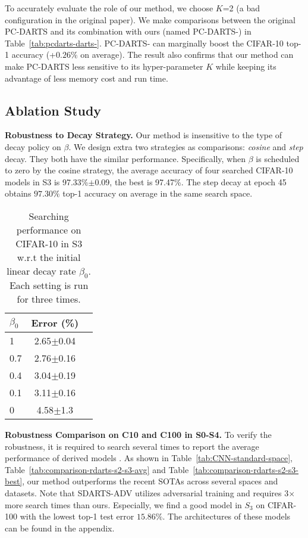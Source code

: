 \documentclass{article} \usepackage{iclr2021_conference,times}
\begin{document}
To accurately evaluate the role of our method, we choose $K$=2 (a bad configuration in the original paper). We make comparisons between the original PC-DARTS and its combination with ours (named PC-DARTS-) in Table~\ref{tab:pcdarts-darts-}. PC-DARTS- can marginally boost the CIFAR-10 top-1 accuracy (+$0.26\%$ on average). The result also confirms that our method can make PC-DARTS less sensitive to its hyper-parameter $K$ while keeping its advantage of less memory cost and run time. 


\subsection{Ablation Study}\label{sec:ablation}

\textbf{Robustness to Decay Strategy.} Our method is insensitive to the type of decay policy on $\beta$. We design extra two strategies as comparisons: \emph{cosine} and \emph{step} decay. They both have the similar performance. Specifically, when $\beta$ is scheduled to zero by the cosine strategy, the average accuracy of four searched CIFAR-10 models in S3  is 97.33\%$\pm$0.09, the best is 97.47\%.  The step decay at epoch 45 obtains $97.30\%$ top-1 accuracy on average in the same search space.   


\begin{wraptable}{r}{5cm}
\vspace{-23pt}
\caption{Searching performance on CIFAR-10 in S3 w.r.t the initial linear decay rate $\beta_0$. Each setting is run for three times.}
\smallskip
	\centering
	\smallskip\begin{tabular}{l*{2}{c}}
		\toprule
$\beta_0$ & Error (\%) \\
    				\midrule
    				1  & 2.65$\pm$0.04 \\
    				0.7 & 2.76$\pm$0.16 \\
    				0.4 &3.04$\pm$0.19 \\
    				0.1   & 3.11$\pm$0.16\\
    				0   & 4.58$\pm$1.3 \\
		\bottomrule
	\end{tabular}
	\label{tab:beta-sensitiveness}
	\vspace{-20pt}
\end{wraptable}


\textbf{Robustness Comparison on C10 and C100 in S0-S4.}
To verify the robustness, it is required to search several times to report the average performance of derived models \citep{Yu2020Evaluating,yang2020nas}.  As shown in Table~\ref{tab:CNN-standard-space}, Table~\ref{tab:comparison-rdarts-s2-s3-avg} and Table~\ref{tab:comparison-rdarts-s2-s3-best}, our method outperforms the recent SOTAs across several spaces and datasets. Note that SDARTS-ADV  utilizes adversarial training and requires 3$\times$ more search times than ours. Especially, we find a good model in $S_3$ on CIFAR-100 with the lowest top-1 test error  $15.86\%$. The architectures of these models can be found in the appendix. 
\end{document}
